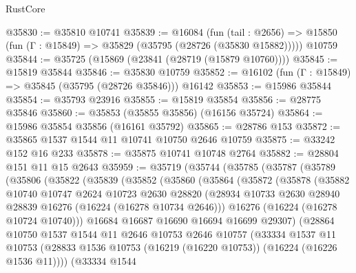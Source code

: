 \begin{lexlean}{RustCore}
\begin{coremodule}
@35830 := @35810 @10741
@35839 := @16084
    (fun (tail : @2656) => @15850 (fun (Γ : @15849) => @35829 (@35795 (@28726 (@35830 @15882)))))
    @10759
@35844 := @35725 (@15869 (@23841 (@28719 (@15879 @10760))))
@35845 := @15819 @35844
@35846 := @35830 @10759
@35852 := @16102 (fun (Γ : @15849) => @35845 (@35795 (@28726 @35846))) @16142
@35853 := @15986 @35844
@35854 := @35793 @23916
@35855 := @15819 @35854
@35856 := @28775 @35846
@35860 := @35853 (@35855 @35856) (@16156 @35724)
@35864 := @15986 @35854 @35856 (@16161 @35792)
@35865 := @28786 @153
@35872 := @35865 @1537 @1544 @11 @10741 @10750 @2646 @10759
@35875 := @33242 @152 @16 @233
@35878 := @35875 @10741 @10748 @2764
@35882 := @28804 @151 @11 @15 @2643
@35959 := @35719
    (@35744
      (@35785
        (@35787
          (@35789
            (@35806
              (@35822
                (@35839
                  (@35852
                    (@35860
                      (@35864
                        (@35872
                          (@35878
                            (@35882
                              @10740
                              @10747
                              @2624
                              @10723
                              @2630
                              @28820
                              (@28934
                                @10733
                                @2630
                                @28940
                                @28839
                                @16276
                                (@16224 (@16278 @10734 @2646)))
                              @16276
                              (@16224 (@16278 @10724 @10740)))
                            @16684
                            @16687
                            @16690
                            @16694
                            @16699
                            @29307)
                          (@28864
                            @10750
                            @1537
                            @1544
                            @11
                            @2646
                            @10753
                            @2646
                            @10757
                            (@33334
                              @1537
                              @11
                              @10753
                              (@28833
                                @1536
                                @10753
                                (@16219 (@16220 @10753))
                                (@16224 (@16226 @1536 @11))))
                            (@33334
                              @1544

\end{coremodule}
\end{lexlean}
